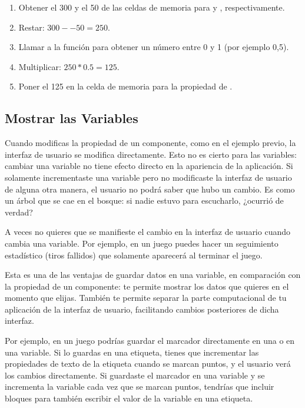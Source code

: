 \begin{enumerate}

\item Obtener el 300 y el 50 de las celdas de memoria para
   y ,
  respectivamente.
\item Restar: $300 -- 50 = 250$.
\item Llamar a la función  para obtener un
  número entre 0 y 1 (por ejemplo 0,5).
\item Multiplicar: $250 * 0.5 = 125$.
\item Poner el 125 en la celda de memoria para la propiedad
   de .
\end{enumerate}

\subsection*{Mostrar las Variables}

Cuando modificas la propiedad de un componente, como en el ejemplo
previo, la interfaz de usuario se modifica directamente. Esto no es
cierto para las variables: cambiar una variable no tiene efecto
directo en la apariencia de la aplicación. Si solamente incrementaste
una variable  pero no modificaste la interfaz de
usuario de alguna otra manera, el usuario no podrá saber que hubo un
cambio. Es como un árbol que se cae en el bosque: si nadie estuvo para
escucharlo, ¿ocurrió de verdad?

A veces no quieres que se manifieste el cambio en la interfaz de
usuario cuando cambia una variable. Por ejemplo, en un juego puedes
hacer un seguimiento estadístico (tiros fallidos) que solamente
aparecerá al terminar el juego.

Esta es una de las ventajas de guardar datos en una variable, en
comparación con la propiedad de un componente: te permite mostrar los
datos que quieres en el momento que elijas. También te permite separar
la parte computacional de tu aplicación de la interfaz de usuario,
facilitando cambios posteriores de dicha interfaz.

Por ejemplo, en un juego podrías guardar el marcador directamente en
una  o en una variable. Si lo guardas en una
etiqueta, tienes que incrementar las propiedades de texto de la
etiqueta cuando se marcan puntos, y el usuario verá los cambios
directamente. Si guardaste el marcador en una variable y se incrementa
la variable cada vez que se marcan puntos, tendrías que incluir
bloques para también escribir el valor de la variable en una etiqueta.

